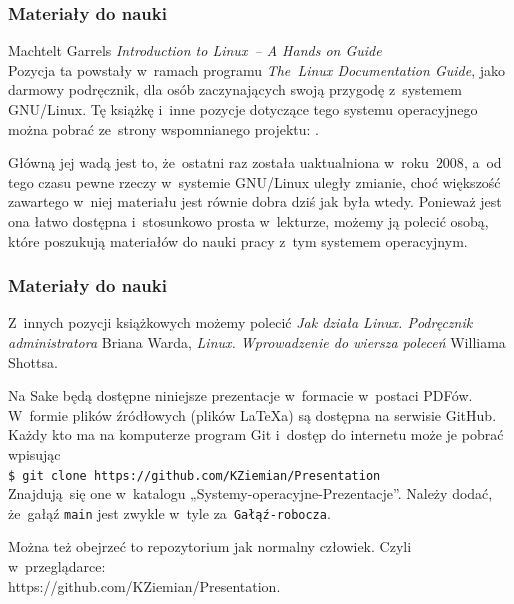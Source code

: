 \documentclass[10pt,t]{beamer}
\begin{document}
\begin{frame}
  \frametitle{Materiały do nauki}


  Machtelt Garrels \textit{Introduction to Linux~-- A Hands on Guide}
  \parencite{Garrels-Introduction-to-Linux-A-Hands-on-Guide-Ver-2008} \\
  Pozycja ta powstały w~ramach programu \textit{The~Linux Documentation
    Guide}, jako darmowy podręcznik, dla osób zaczynających swoją przygodę
  z~systemem GNU/Linux. Tę książkę i~inne pozycje dotyczące tego systemu
  operacyjnego można pobrać ze~strony wspomnianego projektu:
  .

  Główną jej wadą jest to, że~ostatni raz została uaktualniona
  w~roku~$2008$, a~od tego czasu pewne rzeczy w~systemie GNU/Linux uległy
  zmianie, choć większość zawartego w~niej materiału jest równie dobra
  dziś jak była wtedy. Ponieważ jest ona łatwo dostępna i~stosunkowo
  prosta w~lekturze, możemy ją polecić osobą, które poszukują materiałów
  do nauki pracy z~tym systemem operacyjnym.

\end{frame}





\begin{frame}
  \frametitle{Materiały do nauki}


  Z~innych pozycji książkowych możemy polecić
  {\textit{Jak działa Linux. Podręcznik administratora}} Briana Warda,
  {\textit{Linux. Wprowadzenie do wiersza poleceń}} Williama Shottsa.

  Na Sake będą dostępne niniejsze prezentacje w~formacie w~postaci
  PDFów. W~formie plików źródłowych (plików \LaTeX a) są dostępna na
  serwisie GitHub. Każdy kto ma na komputerze program Git i~dostęp do
  internetu może je pobrać wpisując \\
  \texttt{\$ git clone https://github.com/KZiemian/Presentation} \\
  Znajdują~się one w~katalogu „Systemy-operacyjne-Prezentacje”. Należy
  dodać, że~gałąź \texttt{main} jest zwykle w~tyle
  za~\texttt{Gałąź-robocza}.

  Można też obejrzeć to repozytorium jak normalny człowiek. Czyli
  w~przeglądarce: \\
  {https://github.com/KZiemian/Presentation}.

\end{frame}
\end{document}
